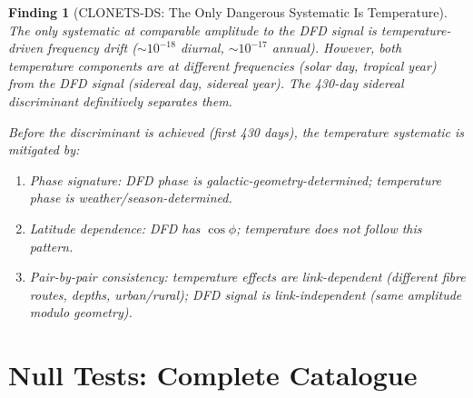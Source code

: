 \documentclass[11pt]{article}
\newtheorem{finding}{Finding}
\begin{document}
\begin{finding}[CLONETS-DS: The Only Dangerous Systematic Is Temperature]
\label{find:dangerous-syst}
The only systematic at comparable amplitude to the DFD signal is
temperature-driven frequency drift ($\sim 10^{-18}$ diurnal, $\sim 10^{-17}$
annual). However, both temperature components are at \emph{different
frequencies} (solar day, tropical year) from the DFD signal (sidereal day,
sidereal year). The 430-day sidereal discriminant definitively separates
them.

Before the discriminant is achieved (first 430 days), the temperature
systematic is mitigated by:
\begin{enumerate}[nosep]
\item Phase signature: DFD phase is galactic-geometry-determined;
  temperature phase is weather/season-determined.
\item Latitude dependence: DFD has $\cos\phi$; temperature does not
  follow this pattern.
\item Pair-by-pair consistency: temperature effects are link-dependent
  (different fibre routes, depths, urban/rural); DFD signal is
  link-independent (same amplitude modulo geometry).
\end{enumerate}
\end{finding}

\section{Null Tests: Complete Catalogue}
\label{sec:null-tests}
\end{document}
